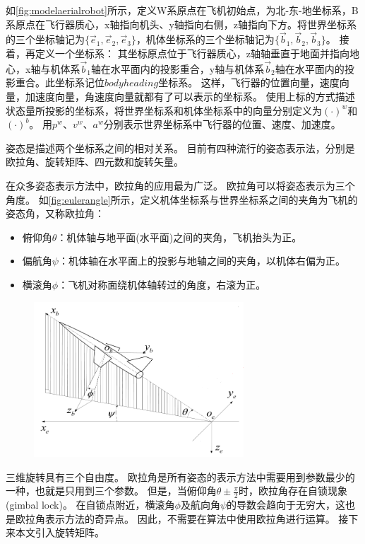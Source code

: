 \documentclass[
  type=master
]{gdutthesis}
\begin{document}
如\autoref{fig:modelaerialrobot}所示，定义W系原点在飞机初始点，为北-东-地坐标系，B系原点在飞行器质心，x轴指向机头、y轴指向右侧，z轴指向下方。将世界坐标系的三个坐标轴记为$\big\{ \vec{e}_1,\vec{e}_2,\vec{e}_3 \big\}$，机体坐标系的三个坐标轴记为$\big\{ \vec{b}_1,\vec{b}_2,\vec{b}_3 \big\}$。
接着，再定义一个坐标系：
其坐标原点位于飞行器质心，z轴轴垂直于地面并指向地心，x轴与机体系$\vec{b}_1$轴在水平面内的投影重合，y轴与机体系$\vec{b}_2$轴在水平面内的投影重合。此坐标系记位$bodyheading$坐标系。
这样，飞行器的位置向量，速度向量，加速度向量，角速度向量就都有了可以表示的坐标系。
使用上标的方式描述状态量所投影的坐标系，将世界坐标系和机体坐标系中的向量分别定义为$(\cdot)^w$和$(\cdot)^b$。
用$p^w$、$v^w$、$a^w$分别表示世界坐标系中飞行器的位置、速度、加速度。

姿态是描述两个坐标系之间的相对关系。
目前有四种流行的姿态表示法，分别是欧拉角、旋转矩阵、四元数和旋转矢量\cite{shuster1993survey}。

在众多姿态表示方法中，欧拉角的应用最为广泛\cite{stuelpnagel1964parametrization}。
欧拉角可以将姿态表示为三个角度。
如\autoref{fig:eulerangle}所示，定义机体坐标系与世界坐标系之间的夹角为飞机的姿态角，又称欧拉角：
\begin{itemize}
	\item 俯仰角$\theta$：机体轴与地平面(水平面)之间的夹角，飞机抬头为正。
	\item 偏航角$\psi$：机体轴在水平面上的投影与地轴之间的夹角，以机体右偏为正。
	\item 横滚角$\phi$：飞机对称面绕机体轴转过的角度，右滚为正。
\end{itemize}
\begin{figure}[htbp]
	\centering
	\includegraphics[width=0.7\textwidth]{屏幕截图 2022-03-31 231147.png}
	\label{fig:eulerangle}
\end{figure}
三维旋转具有三个自由度。
欧拉角是所有姿态的表示方法中需要用到参数最少的一种，也就是只用到三个参数。
但是，当俯仰角$\theta \pm \frac{\pi}{2}$时，欧拉角存在自锁现象(gimbal lock)。
在自锁点附近，横滚角$\phi$及航向角$\psi$的导数会趋向于无穷大，这也是欧拉角表示方法的奇异点。
因此，不需要在算法中使用欧拉角进行运算。
接下来本文引入旋转矩阵。
\end{document}
